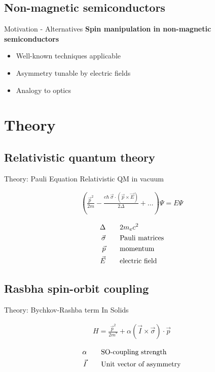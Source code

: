 \documentclass{beamer}
\begin{document}
\subsection{Non-magnetic semiconductors}
\begin{frame}{Motivation - Alternatives}
    \textbf{Spin manipulation in non-magnetic semiconductors}

	\begin{itemize}
		\item Well-known techniques applicable
        \item Asymmetry tunable by electric fields
        \item Analogy to optics
	\end{itemize}
\end{frame}

\section{Theory}
\subsection{Relativistic quantum theory}
\begin{frame}{Theory: Pauli Equation}
    Relativistic QM in vacuum

    \begin{align*}
        \left( \frac{\vec p^2}{2m}- \frac{e\hbar \ \vec\sigma \cdot (\vec p \times \vec E)}
                        {2\Delta} +\ldots\right)\Psi = E \Psi
    \end{align*}

    \begin{align*}
        \Delta\qquad       & 2m_e c^2\\
        \vec \sigma \qquad & \textnormal{Pauli matrices}\\
        \vec p      \qquad & \textnormal{momentum}\\
        \vec E      \qquad & \textnormal{electric field}\\
    \end{align*}

\end{frame}

\subsection{Rasbha spin-orbit coupling}

\begin{frame}{Theory:  Bychkov-Rashba term}
    In Solids

    \begin{align*}
        H = \frac{\vec p^2}{2 m^*} + \alpha (\vec I \times \vec \sigma) \cdot
        \vec p
    \end{align*}

    \begin{align*}
        \alpha  \qquad & \textnormal{SO-coupling strength}\\
        \vec I  \qquad & \textnormal{Unit vector of asymmetry}
    \end{align*}

\end{frame}
\end{document}
